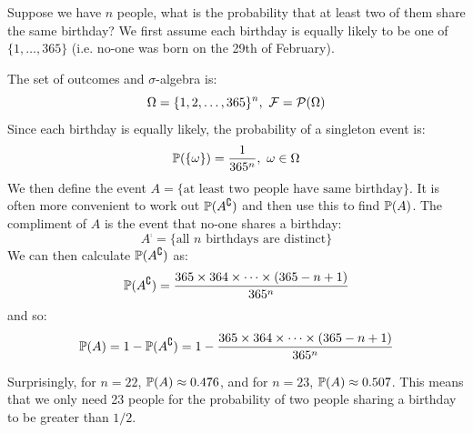 \documentclass[../main.tex]{subfiles}
\begin{document}
\begin{example}
  Suppose we have $n$ people, what is the probability that at least two of them share the same birthday?
  We first assume each birthday is equally likely to be one of $\{1, \ldots, 365\}$ (i.e. no-one was born on the 29th of February).

  The set of outcomes and $\sigma$-algebra is:
  \[
    \Omega = \{1, 2, \ldots, 365\}^n,\ \salg = \powerset{\Omega}
  \]
  Since each birthday is equally likely, the probability of a singleton event is:
  \[
    \P(\{\omega\}) = \frac{1}{365^{n}},\ \omega \in \Omega
  \]
  We then define the event $A = \{\text{at least two people have same birthday}\}$.
  It is often more convenient to work out $\P(A^{\comp})$ and then use this to find $\P(A)$.
  The compliment of $A$ is the event that no-one shares a birthday:
  \[
    A^{\comp} = \{\text{all $n$ birthdays are distinct}\}
  \]
  We can then calculate $\P(A^{\comp})$ as:
  \[
    \P(A^{\comp}) = \frac{365 \times 364 \times \cdots \times (365 - n + 1)}{365^n}
  \]
  and so:
  \[
    \P(A) = 1 - \P(A^{\comp}) = 1 - \frac{365 \times 364 \times \cdots \times (365 - n + 1)}{365^n}
  \]

  Surprisingly, for $n = 22$, $\P(A) \approx 0.476$, and for $n = 23$, $\P(A) \approx 0.507$.
  This means that we only need 23 people for the probability of two people sharing a birthday to be greater than $1/2$.
\end{example}
\end{document}
